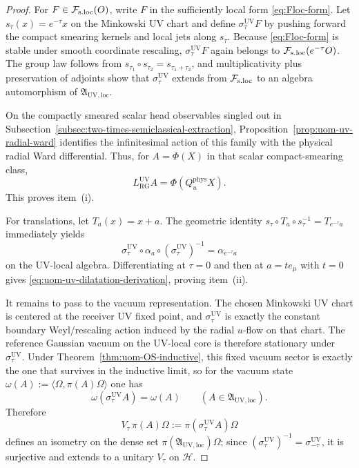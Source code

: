 \documentclass[10pt]{article}
\newcommand{\Fsloc}{\mathcal F_{\rm s.loc}}
\theoremstyle{definition}
\theoremstyle{plain}
\begin{document}
\begin{proof}
For \(F\in\Fsloc(O)\), write \(F\) in the sufficiently local form
\eqref{eq:Floc-form}.  Let \(s_\tau(x)=e^{-\tau}x\) on the Minkowski UV
chart and define \(\sigma_\tau^{\mathrm{UV}}F\) by pushing forward the
compact smearing kernels and local jets along \(s_\tau\).  Because
\eqref{eq:Floc-form} is stable under smooth coordinate rescaling,
\(\sigma_\tau^{\mathrm{UV}}F\) again belongs to \(\Fsloc(e^{-\tau}O)\).
The group law follows from \(s_{\tau_1}\circ s_{\tau_2}=s_{\tau_1+\tau_2}\),
and multiplicativity plus preservation of adjoints show that
\(\sigma_\tau^{\mathrm{UV}}\) extends from \(\Fsloc\) to an algebra
automorphism of \(\mathfrak A_{\mathrm{UV,loc}}\).

On the compactly smeared scalar head observables singled out in
Subsection~\ref{subsec:two-times-semiclassical-extraction},
Proposition~\ref{prop:uom-uv-radial-ward} identifies the infinitesimal
action of this family with the physical radial Ward differential.  Thus,
for \(A=\Phi(X)\) in that scalar compact-smearing class,
\[
L_{\mathrm{RG}}^{\mathrm{UV}}A
=
\Phi(Q_u^{\mathrm{phys}}X).
\]
This proves item~\textnormal{(i)}.

For translations, let \(T_a(x)=x+a\).  The geometric identity
\(
s_\tau\circ T_a\circ s_\tau^{-1}=T_{e^{-\tau}a}
\)
immediately yields
\[
\sigma_\tau^{\mathrm{UV}}\circ \alpha_a\circ
(\sigma_\tau^{\mathrm{UV}})^{-1}
=\alpha_{e^{-\tau}a}
\]
on the UV-local algebra.  Differentiating at \(\tau=0\) and then at
\(a=t e_\mu\) with \(t=0\) gives
\eqref{eq:uom-uv-dilatation-derivation}, proving item~\textnormal{(ii)}.

It remains to pass to the vacuum representation.  The chosen Minkowski
UV chart is centered at the receiver UV fixed point, and
\(\sigma_\tau^{\mathrm{UV}}\) is exactly the constant boundary
Weyl/rescaling action induced by the radial \(u\)-flow on that chart.
The reference Gaussian vacuum on the UV-local core is therefore
stationary under \(\sigma_\tau^{\mathrm{UV}}\).  Under
Theorem~\ref{thm:uom-OS-inductive}, this fixed vacuum sector is exactly
the one that survives in the inductive limit, so for the vacuum state
\(\omega(A):=\langle\Omega,\pi(A)\Omega\rangle\) one has
\[
\omega(\sigma_\tau^{\mathrm{UV}}A)=\omega(A)
\qquad
(A\in\mathfrak A_{\mathrm{UV,loc}}).
\]
Therefore
\[
V_\tau\,\pi(A)\Omega:=\pi(\sigma_\tau^{\mathrm{UV}}A)\Omega
\]
defines an isometry on the dense set
\(\pi(\mathfrak A_{\mathrm{UV,loc}})\Omega\); since
\((\sigma_\tau^{\mathrm{UV}})^{-1}=\sigma_{-\tau}^{\mathrm{UV}}\), it is
surjective and extends to a unitary \(V_\tau\) on \(\mathcal H\).


\end{proof}
\end{document}
